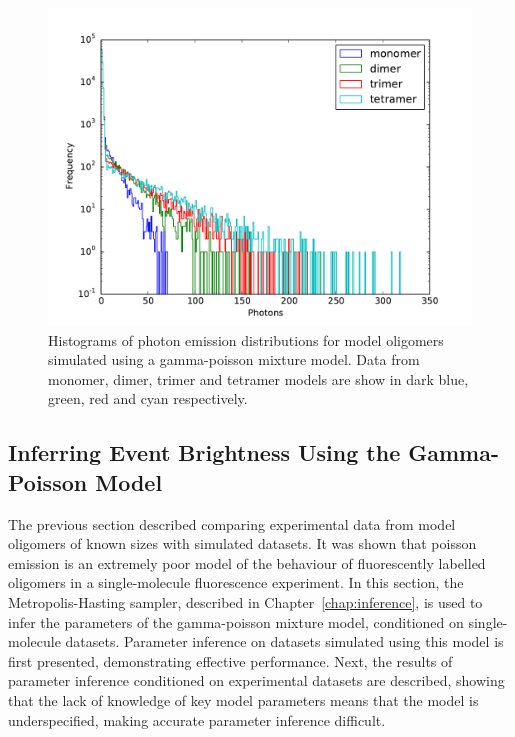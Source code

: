\begin{figure}
   \begin{center}
      \includegraphics*[clip=true, width=6in]{sizing/gamma_poisson_oligomers_log.pdf}
      \caption{Histograms of photon emission distributions for model oligomers simulated using a gamma-poisson mixture model. Data from monomer, dimer, trimer and tetramer models are show in dark blue, green, red and cyan respectively.}
      \label{fig:gamma_poisson_oligomers}
   \end{center}
\end{figure}

\clearpage

\subsection{Inferring Event Brightness Using the Gamma-Poisson Model}
The previous section described comparing experimental data from model oligomers of known sizes with simulated datasets. It was shown that poisson emission is an extremely poor model of the behaviour of fluorescently labelled oligomers in a single-molecule fluorescence experiment. In this section, the Metropolis-Hasting sampler, described in Chapter~\autoref{chap:inference}, is used to infer the parameters of the gamma-poisson mixture model, conditioned on single-molecule datasets. Parameter inference on datasets simulated using this model is first presented, demonstrating effective performance. Next, the results of parameter inference conditioned on experimental datasets are described, showing that the lack of knowledge of key model parameters means that the model is underspecified, making accurate parameter inference difficult.

